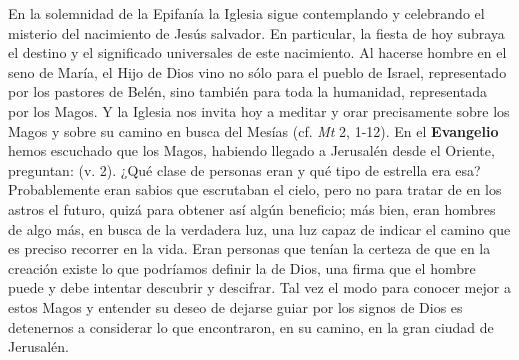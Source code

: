 				\begin{body}
					En la solemnidad de la Epifanía la Iglesia sigue contemplando y celebrando el misterio del nacimiento de Jesús salvador. En particular, la fiesta de hoy subraya el destino y el significado universales de este nacimiento. Al hacerse hombre en el seno de María, el Hijo de Dios vino no sólo para el pueblo de Israel, representado por los pastores de Belén, sino también para toda la humanidad, representada por los Magos. Y la Iglesia nos invita hoy a meditar y orar precisamente sobre los Magos y sobre su camino en busca del Mesías (cf. \emph{Mt} 2, 1-12). En el \textbf{Evangelio} hemos escuchado que los Magos, habiendo llegado a Jerusalén desde el Oriente, preguntan:  (v. 2). ¿Qué clase de personas eran y qué tipo de estrella era esa? Probablemente eran sabios que escrutaban el cielo, pero no para tratar de  en los astros el futuro, quizá para obtener así algún beneficio; más bien, eran hombres  de algo más, en busca de la verdadera luz, una luz capaz de indicar el camino que es preciso recorrer en la vida. Eran personas que tenían la certeza de que en la creación existe lo que podríamos definir la  de Dios, una firma que el hombre puede y debe intentar descubrir y descifrar. Tal vez el modo para conocer mejor a estos Magos y entender su deseo de dejarse guiar por los signos de Dios es detenernos a considerar lo que encontraron, en su camino, en la gran ciudad de Jerusalén.
					

\end{body}
